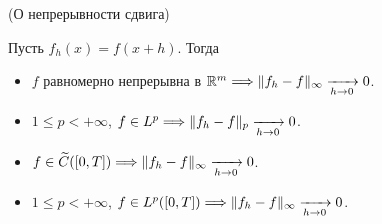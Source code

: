 \begin{theorem}(О непрерывности сдвига)
    
    Пусть $f_h(x) = f(x + h)$. Тогда
    \begin{itemize}
        \item $f$ равномерно непрерывна в $\mathbb{R}^m \Longrightarrow \lVert f_h - f\rVert_{\infty} \xrightarrow[h \to 0]{} 0$.
        \item $1 \leqslant p < +\infty$, $f \in L^p \Longrightarrow \lVert f_h - f\rVert_p \xrightarrow[h \to 0]{} 0$.
        \item $f \in \widetilde{C}([0, T]) \Longrightarrow \lVert f_h - f\rVert_{\infty} \xrightarrow[h \to 0]{} 0$.
        \item $1 \leqslant p < +\infty$, $f \in L^p([0, T]) \Longrightarrow \lVert f_h - f\rVert_{\infty} \xrightarrow[h \to 0]{} 0$.
    \end{itemize} 
\end{theorem}


